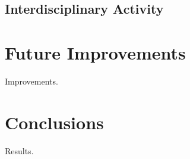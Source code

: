 \documentclass[notitlepage,aps,prd,nofootinbib]{revtex4-1}
\newcommand{\includedir}{../latex_files}
\begin{document}

\subsection{Interdisciplinary Activity}


\section{Future Improvements}
Improvements.

\section{Conclusions}
Results.





\newpage %
\end{document}
